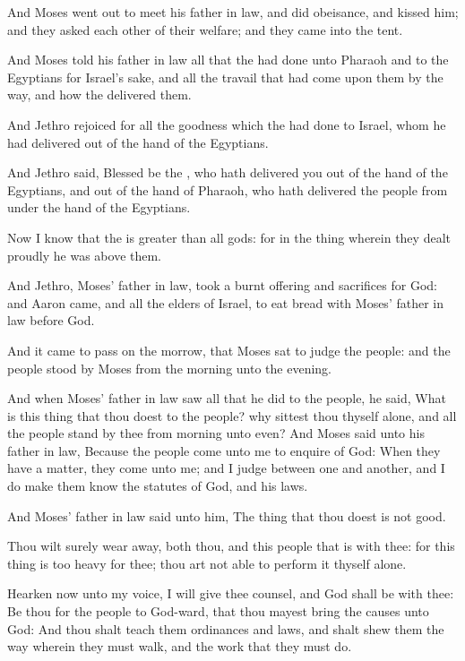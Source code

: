 \verse And Moses went out to meet his father in law, and did obeisance,
and kissed him; and they asked each other of their welfare; and they
came into the tent.

\verse And Moses told his father in law all that the \LORD had done unto
Pharaoh and to the Egyptians for Israel's sake, and all the travail
that had come upon them by the way, and how the \LORD delivered them.

\verse And Jethro rejoiced for all the goodness which the \LORD had done
to Israel, whom he had delivered out of the hand of the Egyptians.

\verse And Jethro said, Blessed be the \LORD, who hath delivered you out
of the hand of the Egyptians, and out of the hand of Pharaoh, who hath
delivered the people from under the hand of the Egyptians.

\verse Now I know that the \LORD is greater than all gods: for in the
thing wherein they dealt proudly he was above them.

\verse And Jethro, Moses' father in law, took a burnt offering and
sacrifices for God: and Aaron came, and all the elders of Israel, to
eat bread with Moses' father in law before God.

\verse And it came to pass on the morrow, that Moses sat to judge the
people: and the people stood by Moses from the morning unto the
evening.

\verse And when Moses' father in law saw all that he did to the people,
he said, What is this thing that thou doest to the people? why sittest
thou thyself alone, and all the people stand by thee from morning unto
even?  \verse And Moses said unto his father in law, Because the people
come unto me to enquire of God: \verse When they have a matter, they
come unto me; and I judge between one and another, and I do make them
know the statutes of God, and his laws.

\verse And Moses' father in law said unto him, The thing that thou
doest is not good.

\verse Thou wilt surely wear away, both thou, and this people that is
with thee: for this thing is too heavy for thee; thou art not able to
perform it thyself alone.

\verse Hearken now unto my voice, I will give thee counsel, and God
shall be with thee: Be thou for the people to God-ward, that thou
mayest bring the causes unto God: \verse And thou shalt teach them
ordinances and laws, and shalt shew them the way wherein they must
walk, and the work that they must do.

